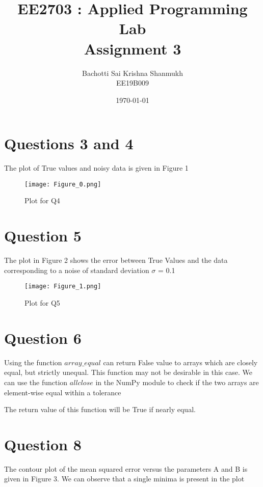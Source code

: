 \documentclass[12pt, a4paper]{report}
\title{\textbf{EE2703 : Applied Programming Lab \\ Assignment 3}} %
\author{Bachotti Sai Krishna Shanmukh \\ EE19B009} %
\date{\today} %
\begin{document}
		
		
\maketitle %
\section*{Questions 3 and 4}
 The plot of True values and noisy data is given in Figure 1  
 
 \begin{figure}[H]
	\centering
	\texttt{[image: Figure\_0.png]}  %
	\caption{Plot for Q4}
	\label{fig:sample}
\end{figure} 

\section*{Question 5}
The plot in Figure 2 shows the error between True Values and the data corresponding to a noise of standard deviation $\sigma$ = 0.1

 \begin{figure}[H]
	\centering
	\texttt{[image: Figure\_1.png]}  %
	\caption{Plot for Q5}
	\label{fig:sample}
\end{figure} 

\section*{Question 6}
Using the function $array\_equal$ can return False value to arrays which are closely equal, but strictly unequal. This function may not be desirable in this case.
We can use the function $allclose$ in the NumPy module to check if the two arrays are element-wise equal within a tolerance


The return value of this function will be True if nearly equal.

\section*{Question 8}
The contour plot of the mean squared error versus the parameters A and B is given in Figure 3. We can observe that a single minima is present in the plot
\end{document}
